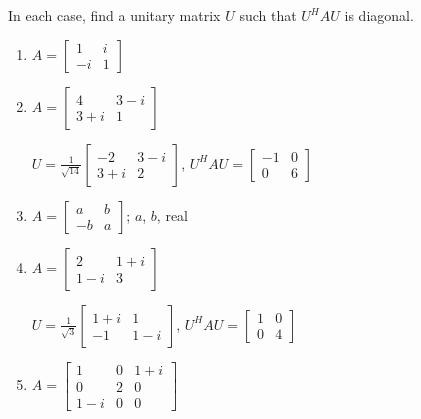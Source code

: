 \documentclass{ximera}
\begin{document}
\begin{problem}\label{prb:complex_matrices8}
In each case, find a unitary matrix $U$ such that $U^{H}AU$ is diagonal.

\begin{enumerate}
\item $A = \left[ \begin{array}{rr}
1 & i\\
-i & 1
\end{array}\right]$


\item $A = \left[ \begin{array}{cc}
4 & 3 - i \\
3 + i & 1
\end{array}\right]$
\begin{hint}
$U = \frac{1}{\sqrt{14}}\left[ \begin{array}{cc}
-2 & 3 - i \\
3 + i & 2
\end{array}\right]$, $U^HAU = \left[ \begin{array}{rr}
-1 & 0 \\
0 & 6
\end{array}\right]$
\end{hint}

\item $A = \left[ \begin{array}{rr}
a & b\\
-b & a
\end{array}\right]$;  $a$, $b$, real

\item $A = \left[ \begin{array}{cc}
2 & 1 + i\\
1 - i & 3
\end{array}\right]$
\begin{hint}
$U = \frac{1}{\sqrt{3}}\left[ \begin{array}{cc}
1 + i & 1 \\
-1 & 1 - i
\end{array}\right]$, $U^HAU = \left[ \begin{array}{rr}
1 & 0 \\
0 & 4
\end{array}\right]$
\end{hint}

\item $A = \left[ \begin{array}{ccc}
1 & 0 &  1 + i\\
0 & 2 & 0 \\
1 - i & 0 & 0
\end{array}\right]$


\end{enumerate}
\end{problem}
\end{document}

